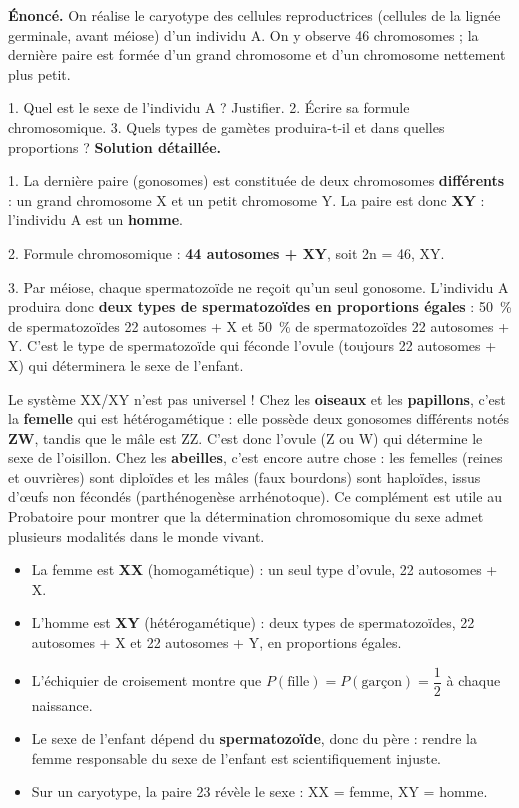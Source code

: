 \documentclass[11pt]{article}
\begin{document}
\begin{exoresolu}
\textbf{Énoncé.} On réalise le caryotype des cellules reproductrices (cellules de la lignée germinale, avant méiose) d'un individu A. On y observe 46 chromosomes ; la dernière paire est formée d'un grand chromosome et d'un chromosome nettement plus petit.

1. Quel est le sexe de l'individu A ? Justifier.
2. Écrire sa formule chromosomique.
3. Quels types de gamètes produira-t-il et dans quelles proportions ?
\tcblower
\textbf{Solution détaillée.}

1. La dernière paire (gonosomes) est constituée de deux chromosomes \textbf{différents} : un grand chromosome X et un petit chromosome Y. La paire est donc \textbf{XY} : l'individu A est un \textbf{homme}.

2. Formule chromosomique : \textbf{44 autosomes + XY}, soit 2n = 46, XY.

3. Par méiose, chaque spermatozoïde ne reçoit qu'un seul gonosome. L'individu A produira donc \textbf{deux types de spermatozoïdes en proportions égales} : 50~\% de spermatozoïdes 22 autosomes + X et 50~\% de spermatozoïdes 22 autosomes + Y. C'est le type de spermatozoïde qui féconde l'ovule (toujours 22 autosomes + X) qui déterminera le sexe de l'enfant.
\end{exoresolu}

\begin{savaistu}
Le système XX/XY n'est pas universel ! Chez les \textbf{oiseaux} et les \textbf{papillons}, c'est la \textbf{femelle} qui est hétérogamétique : elle possède deux gonosomes différents notés \textbf{ZW}, tandis que le mâle est ZZ. C'est donc l'ovule (Z ou W) qui détermine le sexe de l'oisillon. Chez les \textbf{abeilles}, c'est encore autre chose : les femelles (reines et ouvrières) sont diploïdes et les mâles (faux bourdons) sont haploïdes, issus d'œufs non fécondés (parthénogenèse arrhénotoque). Ce complément est utile au Probatoire pour montrer que la détermination chromosomique du sexe admet plusieurs modalités dans le monde vivant.
\end{savaistu}

\begin{aretenir}
\begin{itemize}
\item La femme est \textbf{XX} (homogamétique) : un seul type d'ovule, 22 autosomes + X.
\item L'homme est \textbf{XY} (hétérogamétique) : deux types de spermatozoïdes, 22 autosomes + X et 22 autosomes + Y, en proportions égales.
\item L'échiquier de croisement montre que $P(\text{fille}) = P(\text{garçon}) = \dfrac{1}{2}$ à chaque naissance.
\item Le sexe de l'enfant dépend du \textbf{spermatozoïde}, donc du père : rendre la femme responsable du sexe de l'enfant est scientifiquement injuste.
\item Sur un caryotype, la paire 23 révèle le sexe : XX = femme, XY = homme.
\end{itemize}
\end{aretenir}
\end{document}
